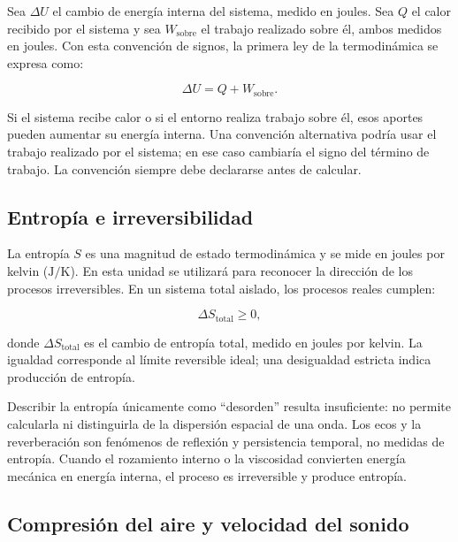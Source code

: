 Sea \(\Delta U\) el cambio de energía interna del sistema, medido en joules. Sea \(Q\) el calor recibido por el sistema y sea \(W_\mathrm{sobre}\) el trabajo realizado sobre él, ambos medidos en joules. Con esta convención de signos, la primera ley de la termodinámica se expresa como:

\begin{equation}
    \Delta U=Q+W_\mathrm{sobre}.
    \label{eq:u2-primera-ley-termo}
\end{equation}

Si el sistema recibe calor o si el entorno realiza trabajo sobre él, esos aportes pueden aumentar su energía interna. Una convención alternativa podría usar el trabajo realizado por el sistema; en ese caso cambiaría el signo del término de trabajo. La convención siempre debe declararse antes de calcular.

\subsection{Entropía e irreversibilidad}
\label{sec:u2-entropia}

La entropía \(S\) es una magnitud de estado termodinámica y se mide en joules por kelvin (\(\text{J}/\text{K}\)). En esta unidad se utilizará para reconocer la dirección de los procesos irreversibles. En un sistema total aislado, los procesos reales cumplen:

\begin{equation}
    \Delta S_\mathrm{total}\geq 0,
    \label{eq:u2-entropia}
\end{equation}

donde \(\Delta S_\mathrm{total}\) es el cambio de entropía total, medido en joules por kelvin. La igualdad corresponde al límite reversible ideal; una desigualdad estricta indica producción de entropía.

Describir la entropía únicamente como ``desorden'' resulta insuficiente: no permite calcularla ni distinguirla de la dispersión espacial de una onda. Los ecos y la reverberación son fenómenos de reflexión y persistencia temporal, no medidas de entropía. Cuando el rozamiento interno o la viscosidad convierten energía mecánica en energía interna, el proceso es irreversible y produce entropía.

\subsection{Compresión del aire y velocidad del sonido}
\label{sec:u2-temperatura-velocidad}

